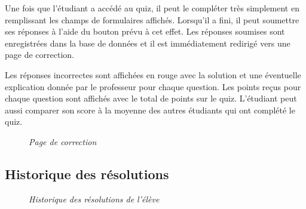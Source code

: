 \documentclass[a4paper,11pt,openany,oneside]{sphinxmanual}
\begin{document}
Une fois que l'étudiant a accédé au quiz, il peut le compléter très simplement en remplissant les champs de formulaires affichés. Lorsqu'il a fini, il peut soumettre ses réponses à l'aide du bouton prévu à cet effet. Les réponses soumises sont enregistrées dans la base de données et il est immédiatement redirigé vers une page de correction.

Les réponses incorrectes sont affichées en rouge avec la solution et une éventuelle explication donnée par le professeur pour chaque question. Les points reçus pour chaque question sont affichés avec le total de points sur le quiz. L'étudiant peut aussi comparer son score à la moyenne des autres étudiants qui ont complété le quiz.
\pagebreak\begin{figure}[htbp]
\centering
\capstart

\caption{\emph{Page de correction}}\end{figure}


\subsection{Historique des résolutions}
\label{doc-user:historique-des-resolutions}\begin{figure}[htbp]
\centering
\capstart

\caption{\emph{Historique des résolutions de l'élève}}\end{figure}
\end{document}
